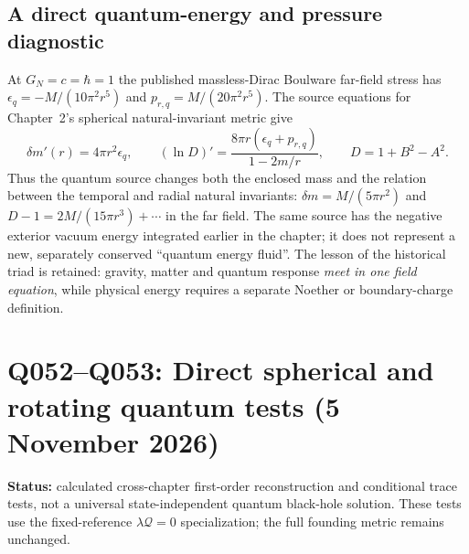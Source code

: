 \documentclass[11pt,a4paper]{article}
\theoremstyle{definition}\newtheorem{definition}[theorem]{Definition}
\theoremstyle{remark}\newtheorem{remark}[theorem]{Remark}
\begin{document}
\subsection{A direct quantum-energy and pressure diagnostic}
At $G_N=c=\hbar=1$ the published massless-Dirac Boulware
far-field stress has
$\epsilon_q=-M/(10\pi^2r^5)$ and
$p_{r,q}=M/(20\pi^2r^5)$.
The source equations for Chapter~2's spherical natural-invariant
metric give
\begin{equation}\label{eq:v17-radialbalance}
\boxed{\delta m'(r)=4\pi r^2\epsilon_q,
\qquad (\ln D)'=\frac{8\pi r(\epsilon_q+p_{r,q})}{1-2m/r},
\qquad D=1+B^2-A^2.}
\end{equation}
Thus the quantum source changes both the enclosed mass and the
relation between the temporal and radial natural invariants:
$\delta m=M/(5\pi r^2)$ and
$D-1=2M/(15\pi r^3)+\cdots$ in the far field.
The same source has the negative exterior vacuum energy integrated
earlier in the chapter; it does
not represent a new, separately conserved ``quantum energy fluid''.
The lesson of the historical triad is retained: gravity, matter and
quantum response \emph{meet in one field equation}, while physical
energy requires a separate Noether or boundary-charge definition.

\section{Q052--Q053: Direct spherical and rotating quantum tests (5 November 2026)}
\label{sec:q053-ch7}
\textbf{Status:} calculated cross-chapter first-order reconstruction and conditional trace tests, not a universal state-independent quantum black-hole solution. These tests use the fixed-reference $\lambda\mathcal Q=0$ specialization; the full founding metric remains unchanged.
\end{document}
